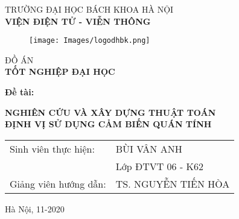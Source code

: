 \begin{titlepage}
\begin{center}
\vspace{-12pt}  TRƯỜNG ĐẠI HỌC BÁCH KHOA HÀ NỘI \\
\textbf{\fontsize{16pt}{0pt}\selectfont VIỆN ĐIỆN TỬ - VIỄN THÔNG}
\vspace{0.5cm}
 \begin{figure}[H]
     \centering
     \texttt{[image: Images/logodhbk.png]}
 \end{figure}
\vspace{1.5cm}
\fontsize{24pt}{0pt}\selectfont ĐỒ ÁN\\
\vspace{12pt}
\textbf{\fontsize{32pt}{0pt}\selectfont TỐT NGHIỆP ĐẠI HỌC}
\vspace{1.5cm}
\end{center}
\hspace{6pt}\textbf{\fontsize{14pt}{0pt}\selectfont Đề tài:}
\begin{center}
    \textbf{\fontsize{20pt}{0pt}\selectfont NGHIÊN CỨU VÀ XÂY DỰNG THUẬT TOÁN}\\
    \textbf{\fontsize{20pt}{0pt}\selectfont ĐỊNH VỊ SỬ DỤNG CẢM BIẾN QUÁN TÍNH}

\vspace{1.5cm}
\begin{table}[H]
    \centering
    \begin{tabular}{l l}
 \fontsize{14pt}{0pt}\selectfont Sinh viên thực hiện:    & \fontsize{14pt}{0pt}\selectfont BÙI VÂN ANH \vspace{6pt} \\ 
     &\fontsize{14pt}{0pt}\selectfont Lớp ĐTVT 06 - K62 \vspace{6pt}\\
\fontsize{14pt}{0pt}\selectfont Giảng viên hướng dẫn: & \fontsize{14pt}{0pt}\selectfont TS. NGUYỄN TIẾN HÒA
\end{tabular}
\end{table}
\vspace{3.5cm}
 \fontsize{14pt}{0pt}\selectfont Hà Nội, 11-2020
\end{center}
\end{titlepage}
